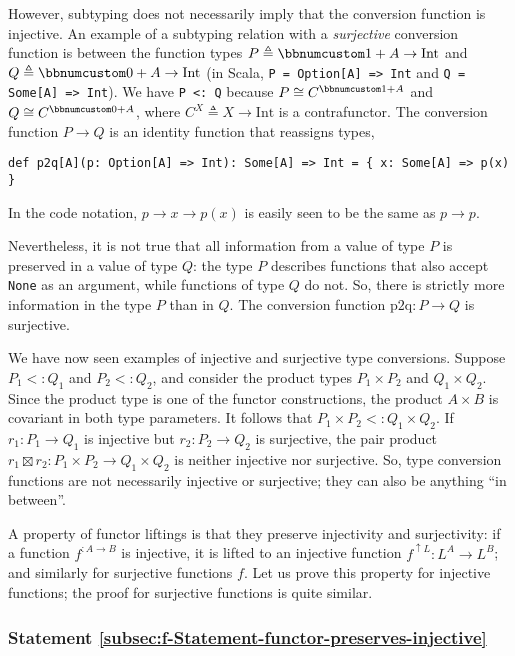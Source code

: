 However, subtyping does not necessarily imply that the conversion
function is injective. An example of a subtyping relation with a \emph{surjective}
conversion function is between the function types $P\triangleq\bbnum 1+A\rightarrow\text{Int}$
and $Q\triangleq\bbnum 0+A\rightarrow\text{Int}$ (in Scala, \lstinline!P = Option[A] => Int!
and \lstinline!Q = Some[A] => Int!). We have \lstinline!P <: Q!
because $P\cong C^{\bbnum 1+A}$ and $Q\cong C^{\bbnum 0+A}$, where
$C^{X}\triangleq X\rightarrow\text{Int}$ is a contrafunctor. The
conversion function $P\rightarrow Q$ is an identity function that
reassigns types,
\begin{lstlisting}
def p2q[A](p: Option[A] => Int): Some[A] => Int = { x: Some[A] => p(x) }
\end{lstlisting}
In the code notation, $p\rightarrow x\rightarrow p(x)$ is easily
seen to be the same as $p\rightarrow p$. 

Nevertheless, it is not true that all information from a value of
type $P$ is preserved in a value of type $Q$: the type $P$ describes
functions that also accept \lstinline!None! as an argument, while
functions of type $Q$ do not. So, there is strictly more information
in the type $P$ than in $Q$. The conversion function $\text{p2q}:P\rightarrow Q$
is surjective.

We have now seen examples of injective and surjective type conversions.
Suppose $P_{1}<:Q_{1}$ and $P_{2}<:Q_{2}$, and consider the product
types $P_{1}\times P_{2}$ and $Q_{1}\times Q_{2}$. Since the product
type is one of the functor constructions, the product $A\times B$
is covariant in both type parameters. It follows that $P_{1}\times P_{2}<:Q_{1}\times Q_{2}$.
If $r_{1}:P_{1}\rightarrow Q_{1}$ is injective but $r_{2}:P_{2}\rightarrow Q_{2}$
is surjective, the pair product $r_{1}\boxtimes r_{2}:P_{1}\times P_{2}\rightarrow Q_{1}\times Q_{2}$
is neither injective nor surjective. So, type conversion functions
are not necessarily injective or surjective; they can also be anything
\textsf{``}in between\textsf{''}.

A property of functor liftings is that they preserve injectivity and
surjectivity: if a function $f^{:A\rightarrow B}$ is injective, it
is lifted to an injective function $f^{\uparrow L}:L^{A}\rightarrow L^{B}$;
and similarly for surjective functions $f$. Let us prove this property
for injective functions; the proof for surjective functions is quite
similar.

\subsubsection{Statement \label{subsec:f-Statement-functor-preserves-injective}\ref{subsec:f-Statement-functor-preserves-injective}}

